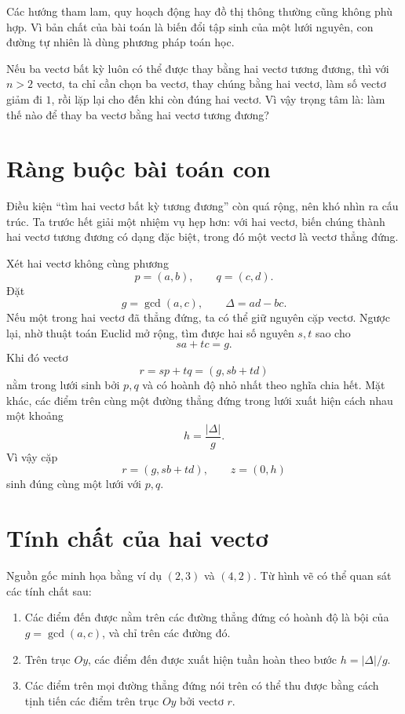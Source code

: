 \documentclass[11pt]{article}
\begin{document}
Các hướng tham lam, quy hoạch động hay đồ thị thông thường cũng không phù hợp.
Vì bản chất của bài toán là biến đổi tập sinh của một lưới nguyên, con đường
tự nhiên là dùng phương pháp toán học.

Nếu ba vectơ bất kỳ luôn có thể được thay bằng hai vectơ tương đương, thì với
\(n>2\) vectơ, ta chỉ cần chọn ba vectơ, thay chúng bằng hai vectơ, làm số
vectơ giảm đi \(1\), rồi lặp lại cho đến khi còn đúng hai vectơ. Vì vậy trọng
tâm là: làm thế nào để thay ba vectơ bằng hai vectơ tương đương?

\section{Ràng buộc bài toán con}

Điều kiện ``tìm hai vectơ bất kỳ tương đương'' còn quá rộng, nên khó nhìn ra
cấu trúc. Ta trước hết giải một nhiệm vụ hẹp hơn: với hai vectơ, biến chúng
thành hai vectơ tương đương có dạng đặc biệt, trong đó một vectơ là vectơ
thẳng đứng.

Xét hai vectơ không cùng phương
\[
  p=(a,b),\qquad q=(c,d).
\]
Đặt
\[
  g=\gcd(a,c),\qquad \Delta=ad-bc.
\]
Nếu một trong hai vectơ đã thẳng đứng, ta có thể giữ nguyên cặp vectơ. Ngược
lại, nhờ thuật toán Euclid mở rộng, tìm được hai số nguyên \(s,t\) sao cho
\[
  sa+tc=g.
\]
Khi đó vectơ
\[
  r=sp+tq=(g,sb+td)
\]
nằm trong lưới sinh bởi \(p,q\) và có hoành độ nhỏ nhất theo nghĩa chia hết.
Mặt khác, các điểm trên cùng một đường thẳng đứng trong lưới xuất hiện cách
nhau một khoảng
\[
  h=\frac{|\Delta|}{g}.
\]
Vì vậy cặp
\[
  r=(g,sb+td),\qquad z=(0,h)
\]
sinh đúng cùng một lưới với \(p,q\).

\section{Tính chất của hai vectơ}

Nguồn gốc minh họa bằng ví dụ \((2,3)\) và \((4,2)\). Từ hình vẽ có thể quan
sát các tính chất sau:

\begin{enumerate}
  \item Các điểm đến được nằm trên các đường thẳng đứng có hoành độ là bội
  của \(g=\gcd(a,c)\), và chỉ trên các đường đó.
  \item Trên trục \(Oy\), các điểm đến được xuất hiện tuần hoàn theo bước
  \(h=|\Delta|/g\).
  \item Các điểm trên mọi đường thẳng đứng nói trên có thể thu được bằng cách
  tịnh tiến các điểm trên trục \(Oy\) bởi vectơ \(r\).
\end{enumerate}
\end{document}
